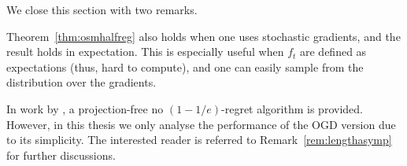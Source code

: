 We close this section with two remarks.
\begin{remark}
    Theorem~\ref{thm:osmhalfreg} also holds when one uses stochastic gradients, and the result holds in expectation. This is especially useful when $f_t$ are defined as expectations (thus, hard to compute), and one can easily sample from the distribution over the gradients. 
\end{remark}
\begin{remark}
    In work by \citep{chen2018projection}, a projection-free no $(1-1/e)$-regret algorithm is provided. However, in this thesis we only analyse the performance of the OGD version due to its simplicity. The interested reader is referred to Remark~\ref{rem:lengthasymp} for further discussions.
\end{remark}
 

